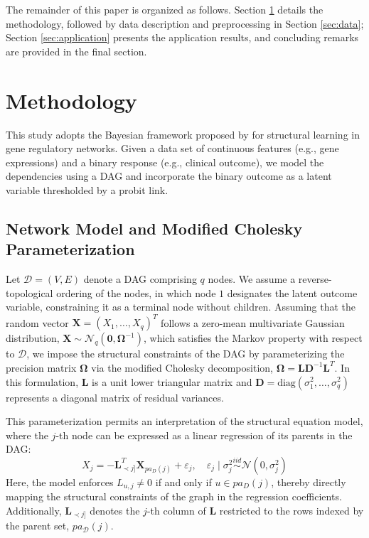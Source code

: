 \documentclass[twoside]{article}
\begin{document}
The remainder of this paper is organized as follows. Section \ref{sec:methodology} details the methodology, followed by data description and preprocessing in Section \ref{sec:data}; Section \ref{sec:application} presents the application results, and concluding remarks are provided in the final section.
\vspace{-1.4cm}\section{Methodology}
\label{sec:methodology}

This study adopts the Bayesian framework proposed by \cite{Nazari:2026} for structural learning in gene regulatory networks. 
Given a data set of continuous features (e.g., gene expressions) and a binary response (e.g., clinical outcome), we model the dependencies using a DAG and incorporate the binary outcome as a latent variable thresholded by a probit link.

\subsection{Network Model and Modified Cholesky Parameterization}
\label{subsec:MChD}

Let $\mathcal{D} = (V, E)$ denote a DAG comprising $q$ nodes. We assume a reverse-topological ordering of the nodes, in which node $1$ designates the latent outcome variable, constraining it as a terminal node without children. Assuming that the random vector $\boldsymbol{X} = (X_1, \ldots, X_q)^T$ follows a zero-mean multivariate Gaussian distribution, $\boldsymbol{X} \sim \mathcal{N}_q(\boldsymbol{0}, \boldsymbol{\Omega}^{-1})$, which satisfies the Markov property with respect to $\mathcal{D}$, we impose the structural constraints of the DAG by parameterizing the precision matrix $\boldsymbol{\Omega}$ via the modified Cholesky decomposition, $\boldsymbol{\Omega} = \boldsymbol{L} \boldsymbol{D}^{-1} \boldsymbol{L}^T$. In this formulation, $\boldsymbol{L}$ is a unit lower triangular matrix and $\boldsymbol{D} = \text{diag}(\sigma_{1}^{2}, \ldots, \sigma_{q}^{2})$ represents a diagonal matrix of residual variances.

This parameterization permits an interpretation of the structural equation model, where the $j$-th node can be expressed as a linear regression of its parents in the DAG:
\begin{equation*}
	X_j = - \boldsymbol{L}_{\prec j \rbrack}^T \boldsymbol{X}_{pa_D(j)} + \varepsilon_j, \quad \varepsilon_j \mid \sigma_j^2 \overset{iid}{\sim} \mathcal{N}(0, \sigma_j^2)	
\end{equation*}
Here, the model enforces $L_{u,j} \neq 0$ if and only if $u \in pa_D(j)$, thereby directly mapping the structural constraints of the graph in the regression coefficients. 
Additionally, $\boldsymbol{L}_{\prec j]}$ denotes the $j$-th column of $\boldsymbol{L}$ restricted to the rows indexed by the parent set, $pa_{\mathcal{D}}(j)$.
\end{document}
